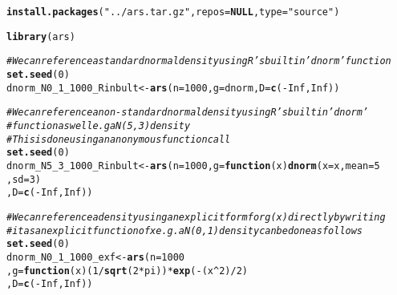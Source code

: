\documentclass{article}\usepackage[]{graphicx}\usepackage[]{color}
\makeatletter
\newcommand{\hlnum}[1]{\textcolor[rgb]{0.686,0.059,0.569}{#1}}%
\newcommand{\hlstr}[1]{\textcolor[rgb]{0.192,0.494,0.8}{#1}}%
\newcommand{\hlcom}[1]{\textcolor[rgb]{0.678,0.584,0.686}{\textit{#1}}}%
\newcommand{\hlopt}[1]{\textcolor[rgb]{0,0,0}{#1}}%
\newcommand{\hlstd}[1]{\textcolor[rgb]{0.345,0.345,0.345}{#1}}%
\newcommand{\hlkwa}[1]{\textcolor[rgb]{0.161,0.373,0.58}{\textbf{#1}}}%
\newcommand{\hlkwb}[1]{\textcolor[rgb]{0.69,0.353,0.396}{#1}}%
\newcommand{\hlkwc}[1]{\textcolor[rgb]{0.333,0.667,0.333}{#1}}%
\newcommand{\hlkwd}[1]{\textcolor[rgb]{0.737,0.353,0.396}{\textbf{#1}}}%
\newenvironment{kframe}{%
 \def\at@end@of@kframe{}%
 \ifinner\ifhmode%
  \def\at@end@of@kframe{\end{minipage}}%
  \begin{minipage}{\columnwidth}%
 \fi\fi%
 \def\FrameCommand##1{\hskip\@totalleftmargin \hskip-\fboxsep
 \colorbox{shadecolor}{##1}\hskip-\fboxsep
     \hskip-\linewidth \hskip-\@totalleftmargin \hskip\columnwidth}%
 \MakeFramed {\advance\hsize-\width
   \@totalleftmargin\z@ \linewidth\hsize
   \@setminipage}}%
 {\par\unskip\endMakeFramed%
 \at@end@of@kframe}
\newenvironment{knitrout}{}{} %
\makeatother
\begin{document}
\begin{knitrout}
\color{fgcolor}\begin{kframe}
\begin{alltt}
 \hlkwd{install.packages}\hlstd{(}\hlstr{"../ars.tar.gz"}\hlstd{,} \hlkwc{repos}\hlstd{=}\hlkwa{NULL}\hlstd{,} \hlkwc{type}\hlstd{=}\hlstr{"source"}\hlstd{)}
\end{alltt}


{\ttfamily\noindent\itshape\color{messagecolor}{\#\# Installing package into 'E:/Gus Files/My Documents/R/win-library/3.2'\\\#\# (as 'lib' is unspecified)}}\begin{alltt}
 \hlkwd{library}\hlstd{(ars)}

 \hlcom{# We can reference a standard normal density using R's built in 'dnorm' function}
 \hlkwd{set.seed}\hlstd{(}\hlnum{0}\hlstd{)}
 \hlstd{dnorm_N0_1_1000_Rinbult} \hlkwb{<-} \hlkwd{ars}\hlstd{(}\hlkwc{n} \hlstd{=} \hlnum{1000}\hlstd{,} \hlkwc{g} \hlstd{= dnorm,} \hlkwc{D} \hlstd{=} \hlkwd{c}\hlstd{(}\hlopt{-}\hlnum{Inf}\hlstd{,}\hlnum{Inf}\hlstd{))}

 \hlcom{# We can reference a non-standard normal density using R's built in 'dnorm' }
 \hlcom{# function as well e.g a N(5, 3) density}
 \hlcom{# This is done using an anonymous function call}
 \hlkwd{set.seed}\hlstd{(}\hlnum{0}\hlstd{)}
 \hlstd{dnorm_N5_3_1000_Rinbult} \hlkwb{<-} \hlkwd{ars}\hlstd{(}\hlkwc{n} \hlstd{=} \hlnum{1000}\hlstd{,} \hlkwc{g} \hlstd{=} \hlkwa{function}\hlstd{(}\hlkwc{x}\hlstd{)} \hlkwd{dnorm}\hlstd{(}\hlkwc{x} \hlstd{= x,} \hlkwc{mean} \hlstd{=} \hlnum{5}
                                                               \hlstd{,} \hlkwc{sd} \hlstd{=} \hlnum{3}\hlstd{)}
                               \hlstd{,} \hlkwc{D} \hlstd{=} \hlkwd{c}\hlstd{(}\hlopt{-}\hlnum{Inf}\hlstd{,}\hlnum{Inf}\hlstd{))}

 \hlcom{# We can reference a density using an explicit form for g(x) directly by writing }
 \hlcom{# it as an explicit function of x e.g. a N(0, 1) density can be done as follows}
 \hlkwd{set.seed}\hlstd{(}\hlnum{0}\hlstd{)}
 \hlstd{dnorm_N0_1_1000_exf} \hlkwb{<-} \hlkwd{ars}\hlstd{(}\hlkwc{n} \hlstd{=} \hlnum{1000}
                             \hlstd{,} \hlkwc{g} \hlstd{=} \hlkwa{function}\hlstd{(}\hlkwc{x}\hlstd{) (}\hlnum{1}\hlopt{/}\hlkwd{sqrt}\hlstd{(}\hlnum{2}\hlopt{*}\hlstd{pi))}\hlopt{*}\hlkwd{exp}\hlstd{(}\hlopt{-}\hlstd{(x}\hlopt{^}\hlnum{2}\hlstd{)}\hlopt{/}\hlnum{2}\hlstd{)}
                             \hlstd{,} \hlkwc{D} \hlstd{=} \hlkwd{c}\hlstd{(}\hlopt{-}\hlnum{Inf}\hlstd{,}\hlnum{Inf}\hlstd{))}


\end{alltt}
\end{kframe}
\end{knitrout}
\end{document}
